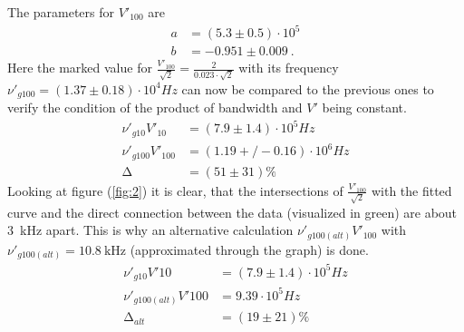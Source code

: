 \noindent
The parameters for $V'_{100}$ are
\begin{align*}
a &= (5.3\pm 0.5)\cdot 10^5 \\
b &= -0.951\pm 0.009 \ .
\end{align*}
Here the marked value for $\frac{V'_{100}}{\sqrt{2}} = \frac{2}{0.023\cdot \sqrt{2}}$ with its frequency $\nu'_{g100} = (1.37 \pm 0.18)\cdot 10^4 Hz$ can now be
compared to the previous ones to verify the condition of the product of bandwidth and $V'$ being constant.
\begin{align*}
\nu'_{g10} V'_{10} &= (7.9\pm 1.4)\cdot 10^5 Hz \\
\nu'_{g100} V'_{100} &= (1.19+/-0.16)\cdot 10^6 Hz \\
\upDelta &= (51\pm 31) \%
\end{align*}
Looking at figure (\ref{fig:2}) it is clear, that the intersections of $\frac{V'_{100}}{\sqrt{2}}$ with the fitted curve and the direct connection between the data (visualized in green)
are about \SI{3}{\kilo\hertz} apart. This is why an alternative calculation $\nu'_{g100(alt)} V'_{100}$ with $\nu'_{g100(alt)} = \SI{10.8}{\kilo\hertz}$ (approximated through the graph) is done.
\begin{align*}
\nu'_{g10} V'{10} &= (7.9\pm 1.4)\cdot 10^5 Hz \\
\nu'_{g100(alt)} V'{100} &= 9.39\cdot 10^5 Hz \\
\upDelta_{alt} &= (19\pm 21) \%
\end{align*}

